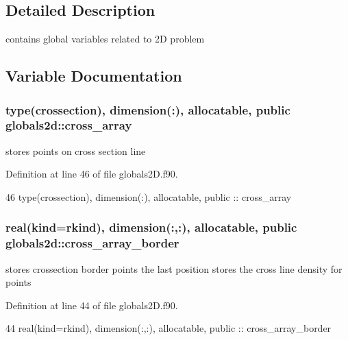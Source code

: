 \subsection{Detailed Description}
contains global variables related to 2D problem 

\subsection{Variable Documentation}
\subsubsection[{cross\+\_\+array}]{\setlength{\rightskip}{0pt plus 5cm}type({\bf crossection}), dimension(\+:), allocatable, public globals2d\+::cross\+\_\+array}\label{namespaceglobals2d_ab177e3d1ae807eddae9da0d216555af7}


stores points on cross section line 



Definition at line 46 of file globals2\+D.\+f90.


\begin{DoxyCode}
46   \textcolor{keywordtype}{type}(crossection), \textcolor{keywordtype}{dimension(:)}, \textcolor{keywordtype}{allocatable}, \textcolor{keywordtype}{public} :: cross_array
\end{DoxyCode}
\subsubsection[{cross\+\_\+array\+\_\+border}]{\setlength{\rightskip}{0pt plus 5cm}real(kind=rkind), dimension(\+:,\+:), allocatable, public globals2d\+::cross\+\_\+array\+\_\+border}\label{namespaceglobals2d_a276b5b0f5354082a6cc71dbce15996d8}


stores crossection border points the last position stores the cross line density for points 



Definition at line 44 of file globals2\+D.\+f90.


\begin{DoxyCode}
44   \textcolor{keywordtype}{real(kind=rkind)}, \textcolor{keywordtype}{dimension(:,:)}, \textcolor{keywordtype}{allocatable},  \textcolor{keywordtype}{public} :: cross_array_border
\end{DoxyCode}
